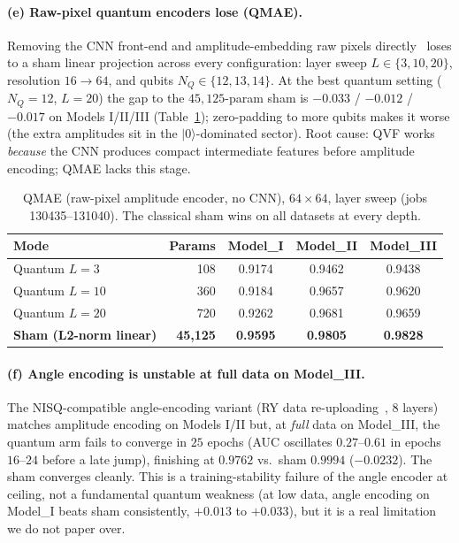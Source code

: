 \documentclass[10pt,letterpaper]{article}
\theoremstyle{plain}
\theoremstyle{definition}
\newcommand{\win}[1]{\textcolor{good}{\textbf{#1}}}
\begin{document}
\paragraph{(e) Raw-pixel quantum encoders lose (QMAE).}
Removing the CNN front-end and amplitude-embedding raw pixels
directly~\cite{andrews2025qmae} loses to a sham linear projection across every
configuration: layer sweep $L\in\{3,10,20\}$, resolution $16\to64$, and qubits
$N_Q\in\{12,13,14\}$. At the best quantum setting ($N_Q{=}12$, $L{=}20$) the gap to
the $45{,}125$-param sham is $-0.033$ / $-0.012$ / $-0.017$ on Models
I/II/III (Table~\ref{tab:qmae-neg}); zero-padding to more qubits makes it worse
(the extra amplitudes sit in the $|0\rangle$-dominated sector). Root cause: QVF
works \emph{because} the CNN produces compact intermediate features before
amplitude encoding; QMAE lacks this stage.

\begin{table}[h!]
\centering
\caption{QMAE (raw-pixel amplitude encoder, no CNN), $64\times64$, layer sweep
(jobs 130435--131040). The classical sham wins on all datasets at every depth.}
\label{tab:qmae-neg}
\begin{tabular}{@{}lrccc@{}}
\toprule
Mode & Params & Model\_I & Model\_II & Model\_III \\
\midrule
Quantum $L{=}3$  & 108 & 0.9174 & 0.9462 & 0.9438 \\
Quantum $L{=}10$ & 360 & 0.9184 & 0.9657 & 0.9620 \\
Quantum $L{=}20$ & 720 & 0.9262 & 0.9681 & 0.9659 \\
\textbf{Sham (L2-norm linear)} & \textbf{45,125} & \win{0.9595} & \win{0.9805} & \win{0.9828} \\
\bottomrule
\end{tabular}
\end{table}

\paragraph{(f) Angle encoding is unstable at full data on Model\_III.}
The NISQ-compatible angle-encoding variant (RY data re-uploading~\cite{perez2020},
$8$ layers) matches amplitude encoding on Models I/II but, at \emph{full} data on Model\_III,
the quantum arm fails to converge in $25$ epochs (AUC oscillates $0.27$--$0.61$ in
epochs $16$--$24$ before a late jump), finishing at $0.9762$ vs.\ sham $0.9994$
($-0.0232$). The sham converges cleanly. This is a training-stability failure of
the angle encoder at ceiling, not a fundamental quantum weakness (at low data,
angle encoding on Model\_I beats sham consistently, $+0.013$ to $+0.033$), but it
is a real limitation we do not paper over.
\end{document}
